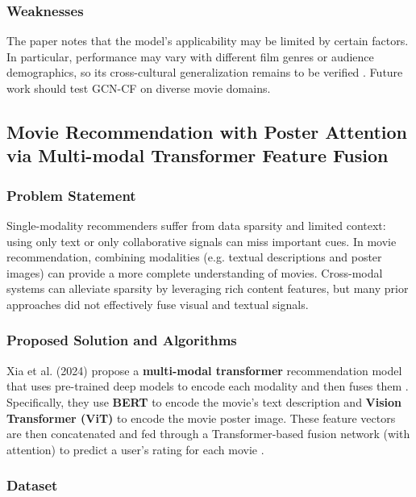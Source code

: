 \subsubsection{Weaknesses}

The paper notes that the model’s applicability may be limited by certain factors. In particular, performance may vary with different film genres or audience demographics, so its cross-cultural generalization remains to be verified \cite{xia2024iot}. Future work should test GCN-CF on diverse movie domains.



\subsection{Movie Recommendation with Poster Attention via Multi-modal Transformer Feature Fusion}

\subsubsection{Problem Statement}

Single-modality recommenders suffer from data sparsity and limited context: using only text or only collaborative signals can miss important cues. In movie recommendation, combining modalities (e.g. textual descriptions and poster images) can provide a more complete understanding of movies. Cross-modal systems can alleviate sparsity by leveraging rich content features, but many prior approaches did not effectively fuse visual and textual signals.



\subsubsection{Proposed Solution and Algorithms}

Xia et al. (2024) propose a \textbf{multi-modal transformer} recommendation model that uses pre-trained deep models to encode each modality and then fuses them \cite{xia2024poster}. Specifically, they use \textbf{BERT} to encode the movie’s text description and \textbf{Vision Transformer (ViT)} to encode the movie poster image. These feature vectors are then concatenated and fed through a Transformer-based fusion network (with attention) to predict a user’s rating for each movie \cite{xia2024poster}.



\subsubsection{Dataset}

